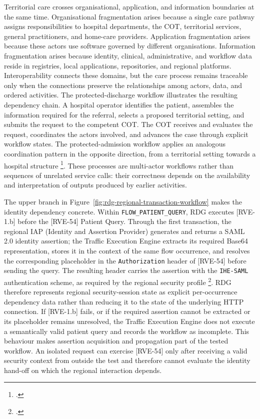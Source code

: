 \noindent Territorial care crosses organisational, application, and information
boundaries at the same time. Organisational fragmentation arises because a
single care pathway assigns responsibilities to hospital departments, the COT,
territorial services, general practitioners, and home-care providers.
Application fragmentation arises because these actors use software governed by
different organisations. Information fragmentation arises because identity,
clinical, administrative, and workflow data reside in registries, local
applications, repositories, and regional platforms. Interoperability connects
these domains, but the care process remains traceable only when the connections
preserve the relationships among actors, data, and ordered activities. The protected-discharge workflow illustrates the resulting dependency chain. A
hospital operator identifies the patient, assembles the information required for
the referral, selects a proposed territorial setting, and submits the request to
the competent COT. The COT receives and evaluates the request, coordinates the
actors involved, and advances the case through explicit workflow states. The
protected-admission workflow applies an analogous coordination pattern in the
opposite direction, from a territorial setting towards a hospital structure
\footcite[Sections~2.1.5 and~2.4.1]{rti-siter-relazione-tecnica}. These processes
are multi-actor workflows rather than sequences of unrelated service calls:
their correctness depends on the availability and interpretation of outputs
produced by earlier activities.

\noindent The upper branch in Figure~\ref{fig:rdg-regional-transaction-workflow} makes the
identity dependency concrete. Within \texttt{FLOW\_PATIENT\_QUERY}, RDG executes
[RVE-1.b] before the [RVE-54] Patient Query. Through the first transaction, the
regional IAP (Identity and Assertion Provider) generates and returns a SAML 2.0 identity
assertion; the Traffic Execution Engine extracts its required Base64 representation,
stores it in the context of the same flow occurrence, and resolves the corresponding placeholder in the
\texttt{Authorization} header of [RVE-54] before sending the query. The resulting
header carries the assertion with the \texttt{IHE-SAML} authentication scheme,
as required by the regional security profile \footcites{arsenal-security-v214}{arsenal-anagrafe-zero-v26}.
RDG therefore represents regional security-session state as explicit
per-occurrence dependency data rather than reducing it to the state of the
underlying HTTP connection. If [RVE-1.b] fails, or if the required assertion cannot be
extracted or its placeholder remains unresolved, the Traffic Execution Engine does not execute a
semantically valid patient query and records the workflow as incomplete. This
behaviour makes assertion acquisition and propagation part of the tested
workflow. An isolated request can exercise [RVE-54] only after receiving a valid
security context from outside the test and therefore cannot evaluate the
identity hand-off on which the regional interaction depends.

